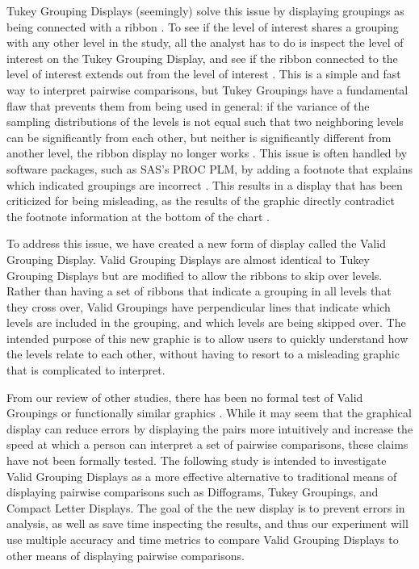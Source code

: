 \documentclass{article}
\begin{document}
Tukey Grouping Displays (seemingly) solve this issue by displaying groupings as being connected with a ribbon \cite{CLDVsLines, dontUseBars, CLDInvest, aovLibre, diffogramAndOtra, procPLM}. To see if the level of interest shares a grouping with any other level in the study, all the analyst has to do is inspect the level of interest on the Tukey Grouping Display, and see if the ribbon connected to the level of interest extends out from the level of interest \cite{CLDVsLines, dontUseBars, CLDInvest, aovLibre, diffogramAndOtra, procPLM}. This is a simple and fast way to interpret pairwise comparisons, but Tukey Groupings have a fundamental flaw that prevents them from being used in general: if the variance of the sampling distributions of the levels is not equal such that two neighboring levels can be significantly from each other, but neither is significantly different from another level, the ribbon display no longer works \cite{CLDVsLines, dontUseBars, CLDInvest, aovLibre, diffogramAndOtra, procPLM}. This issue is often handled by software packages, such as SAS's PROC PLM, by adding a footnote that explains which indicated groupings are incorrect \cite{diffogramAndOtra, procPLM}. This results in a display that has been criticized for being misleading, as the results of the graphic directly contradict the footnote information at the bottom of the chart \cite{CLDVsLines, dontUseBars, diffogramAndOtra, procPLM}. 

To address this issue, we have created a new form of display called the Valid Grouping Display. Valid Grouping Displays are almost identical to Tukey Grouping Displays but are modified to allow the ribbons to skip over levels. Rather than having a set of ribbons that indicate a grouping in all levels that they cross over, Valid Groupings have perpendicular lines that indicate which levels are included in the grouping, and which levels are being skipped over. The intended purpose of this new graphic is to allow users to quickly understand how the levels relate to each other, without having to resort to a misleading graphic that is complicated to interpret.

From our review of other studies, there has been no formal test of Valid Groupings or functionally similar graphics \cite{CLDVsLines, dontUseBars, CLDInvest, aovLibre, diffogramAndOtra, procPLM}. While it may seem that the graphical display can reduce errors by displaying the pairs more intuitively and increase the speed at which a person can interpret a set of pairwise comparisons, these claims have not been formally tested. The following study is intended to investigate Valid Grouping Displays as a more effective alternative to traditional means of displaying pairwise comparisons such as Diffograms, Tukey Groupings, and Compact Letter Displays. The goal of the the new display is to prevent errors in analysis, as well as save time inspecting the results, and thus our experiment will use multiple accuracy and time metrics to compare Valid Grouping Displays to other means of displaying pairwise comparisons.
\end{document}
